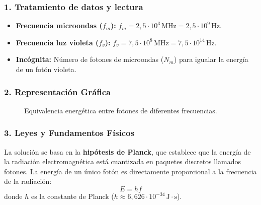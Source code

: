 \subsubsection*{1. Tratamiento de datos y lectura}
\begin{itemize}
    \item \textbf{Frecuencia microondas ($f_m$):} $f_m = 2,5 \cdot 10^3\,\text{MHz} = 2,5 \cdot 10^9\,\text{Hz}$.
    \item \textbf{Frecuencia luz violeta ($f_v$):} $f_v = 7,5 \cdot 10^8\,\text{MHz} = 7,5 \cdot 10^{14}\,\text{Hz}$.
    \item \textbf{Incógnita:} Número de fotones de microondas ($N_m$) para igualar la energía de un fotón violeta.
\end{itemize}

\subsubsection*{2. Representación Gráfica}
\begin{figure}[H]
    \centering
    \caption{Equivalencia energética entre fotones de diferentes frecuencias.}
\end{figure}

\subsubsection*{3. Leyes y Fundamentos Físicos}
La solución se basa en la \textbf{hipótesis de Planck}, que establece que la energía de la radiación electromagnética está cuantizada en paquetes discretos llamados fotones. La energía de un único fotón es directamente proporcional a la frecuencia de la radiación:
$$ E = hf $$
donde $h$ es la constante de Planck ($h \approx 6,626 \cdot 10^{-34}\,\text{J}\cdot\text{s}$).

